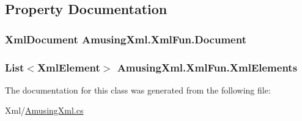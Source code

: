 \subsection{Property Documentation}
\hypertarget{class_amusing_xml_1_1_xml_fun_aa595a38c7976f94d455ce1e05e90797c}{
\subsubsection[{Document}]{\setlength{\rightskip}{0pt plus 5cm}XmlDocument AmusingXml.XmlFun.Document}}
\label{class_amusing_xml_1_1_xml_fun_aa595a38c7976f94d455ce1e05e90797c}
\hypertarget{class_amusing_xml_1_1_xml_fun_a4ef87d10dac57315380a1ccceb749dda}{
\subsubsection[{XmlElements}]{\setlength{\rightskip}{0pt plus 5cm}List$<$XmlElement$>$ AmusingXml.XmlFun.XmlElements}}
\label{class_amusing_xml_1_1_xml_fun_a4ef87d10dac57315380a1ccceb749dda}


The documentation for this class was generated from the following file:\begin{DoxyCompactItemize}
\item 
Xml/\hyperlink{_amusing_xml_8cs}{AmusingXml.cs}\end{DoxyCompactItemize}
